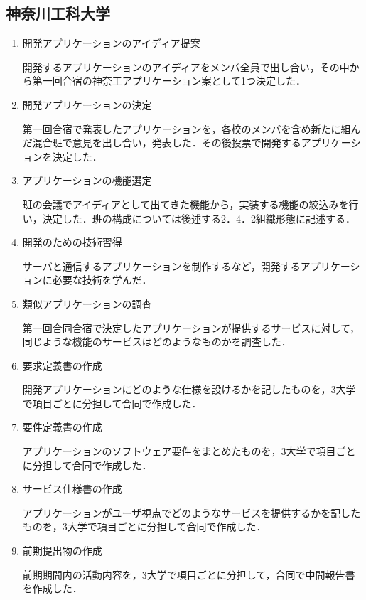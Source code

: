 \subsection{神奈川工科大学}
\begin{enumerate}
\item 開発アプリケーションのアイディア提案
\par 開発するアプリケーションのアイディアをメンバ全員で出し合い，その中から第一回合宿の神奈工アプリケーション案として1つ決定した．
\item 開発アプリケーションの決定
\par 第一回合宿で発表したアプリケーションを，各校のメンバを含め新たに組んだ混合班で意見を出し合い，発表した．その後投票で開発するアプリケーションを決定した．
\item アプリケーションの機能選定
\par 班の会議でアイディアとして出てきた機能から，実装する機能の絞込みを行い，決定した．班の構成については後述する2．4．2組織形態に記述する．
\item 開発のための技術習得
\par サーバと通信するアプリケーションを制作するなど，開発するアプリケーションに必要な技術を学んだ．
\item 類似アプリケーションの調査
\par 第一回合同合宿で決定したアプリケーションが提供するサービスに対して，同じような機能のサービスはどのようなものかを調査した．
\item 要求定義書の作成
\par 開発アプリケーションにどのような仕様を設けるかを記したものを，3大学で項目ごとに分担して合同で作成した．
\item 要件定義書の作成
\par アプリケーションのソフトウェア要件をまとめたものを，3大学で項目ごとに分担して合同で作成した．
\item サービス仕様書の作成
\par アプリケーションがユーザ視点でどのようなサービスを提供するかを記したものを，3大学で項目ごとに分担して合同で作成した．
\item 前期提出物の作成
\par 前期期間内の活動内容を，3大学で項目ごとに分担して，合同で中間報告書を作成した．
\end{enumerate}

